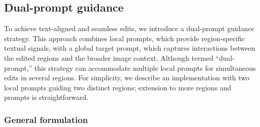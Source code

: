 \documentclass{article}
\begin{document}








\subsection{Dual-prompt guidance}
\label{sec:dualprompt}

To achieve text-aligned and seamless edits, we introduce a dual-prompt guidance strategy. This approach combines local prompts, which provide region-specific textual signals, with a global target prompt, which captures interactions between the edited regions and the broader image context. Although termed ``dual-prompt,'' this strategy can accommodate multiple local prompts for simultaneous edits in several regions. For simplicity, we describe an implementation with two local prompts guiding two distinct regions; extension to more regions and prompts is straightforward.

\subsubsection{General formulation}
\end{document}
